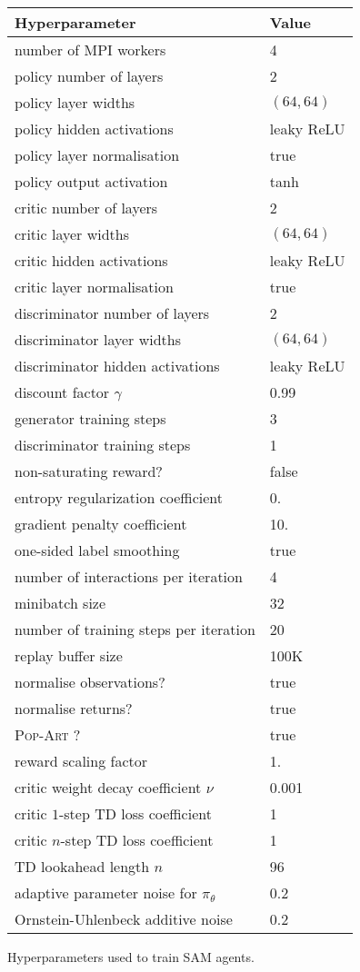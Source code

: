 \begin{figure}
  \center
  \begin{tabular}{|ll|}
    \hline
    Hyperparameter&Value\\
    \hline
    number of MPI workers&4\\
    policy number of layers&2\\
    policy layer widths&$(64, 64)$\\
    policy hidden activations&leaky ReLU\\
    policy layer normalisation \cite{Ba2016-bs}&true\\
    policy output activation&tanh\\
    critic number of layers&2\\
    critic layer widths&$(64, 64)$\\
    critic hidden activations&leaky ReLU\\
    critic layer normalisation&true\\
    discriminator number of layers&2\\
    discriminator layer widths&$(64, 64)$\\
    discriminator hidden activations&leaky ReLU\\
    discount factor $\gamma$&0.99\\
    generator training steps&3\\
    discriminator training steps&1\\
    non-saturating reward?&false\\
    entropy regularization coefficient&0.\\
    gradient penalty \cite{Gulrajani2017-mr} coefficient&10.\\
    one-sided label smoothing&true\\
    number of interactions per iteration&4\\
    minibatch size&32\\
    number of training steps per iteration&20\\
    replay buffer size&100K\\
    normalise observations?&true\\
    normalise returns?&true\\
    \textsc{Pop-Art} \cite{Van_Hasselt2016-bh}?&true\\
    reward scaling factor&1.\\
    critic weight decay coefficient $\nu$&0.001\\
    critic $1$-step TD loss coefficient&1\\
    critic $n$-step TD loss coefficient&1\\
    TD lookahead length $n$&96\\
    adaptive parameter noise for $\pi_\theta$&0.2\\
    Ornstein-Uhlenbeck additive noise&0.2\\
    \hline
  \end{tabular}
  \caption{Hyperparameters used to train SAM agents.}
\end{figure}
